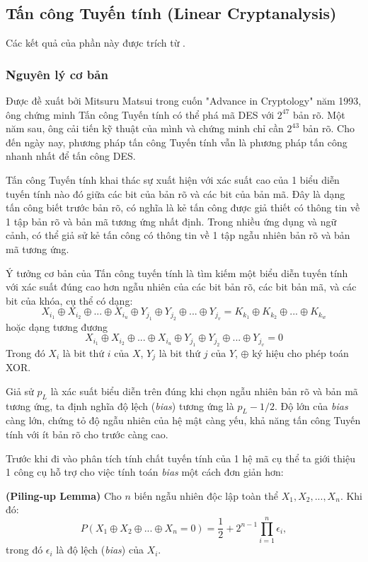\newpage
\subsection{Tấn công Tuyến tính (Linear Cryptanalysis) }
Các kết quả của phần này được trích từ \cite{hey2002}.
\subsubsection{Nguyên lý cơ bản}
Được đề xuất bởi Mitsuru Matsui trong cuốn "Advance in Cryptology" năm 1993, ông chứng minh Tấn công Tuyến tính có thể phá mã DES với $2^{47}$ bản rõ. Một năm sau, ông cải tiến kỹ thuật của mình và chứng minh chỉ cần $2^{43}$ bản rõ. Cho đến ngày nay, phương pháp tấn công Tuyến tính vẫn là phương pháp tấn công nhanh nhất để tấn công DES.

Tấn công Tuyến tính khai thác sự xuất hiện với xác suất cao của 1 biểu diễn tuyến tính nào đó giữa các bit của bản rõ và các bit của bản mã. Đây là dạng tấn công biết trước bản rõ, có nghĩa là kẻ tấn công được giả thiết có thông tin về 1 tập bản rõ và bản mã tương ứng nhất định. Trong nhiều ứng dụng và ngữ cảnh, có thể giả sử kẻ tấn công có thông tin về 1 tập ngẫu nhiên bản rõ và bản mã tương ứng.

Ý tưởng cơ bản của Tấn công tuyến tính là tìm kiếm một biểu diễn tuyến tính với xác suất đúng cao hơn ngẫu nhiên của các bit bản rõ, các bit bản mã, và các bit của khóa, cụ thể có dạng:
$$ X_{i_1} \oplus X_{i_2} \oplus ... \oplus X_{i_u} \oplus Y_{j_1} \oplus Y_{j_2} \oplus ... \oplus Y_{j_v} = K_{k_1} \oplus K_{k_2} \oplus ... \oplus K_{k_w} $$ 
hoặc dạng tương đương 
$$X_{i_1} \oplus X_{i_2} \oplus ... \oplus X_{i_u} \oplus Y_{j_1} \oplus Y_{j_2} \oplus ... \oplus Y_{j_v} = 0 $$
Trong đó $X_i$ là bit thứ $i$ của $X$, $Y_j$ là bit thứ $j$ của $Y$, $\oplus$ ký hiệu cho phép toán XOR.

Giả sử $p_L$ là xác suất biểu diễn trên đúng khi chọn ngẫu nhiên bản rõ và bản mã tương ứng, ta định nghĩa độ lệch (\emph{bias}) tương ứng là $p_L - 1/2.$ Độ lớn của \emph{bias} càng lớn, chứng tỏ độ ngẫu nhiên của hệ mật càng yếu, khả năng tấn công Tuyến tính với ít bản rõ cho trước càng cao.

Trước khi đi vào phân tích tính chất tuyến tính của 1 hệ mã cụ thể ta giới thiệu 1 công cụ hỗ trợ cho việc tính toán \emph{bias} một cách đơn giản hơn:

\textbf{(Piling-up Lemma)} Cho $n$ biến ngẫu nhiên độc lập toàn thể $X_1, X_2,..., X_n$. Khi đó:
    $$P(X_1 \oplus X_2 \oplus ... \oplus X_n = 0) = \frac{1}{2} + 2^{n-1} \prod_{i=1}^n \epsilon_i,  $$
    trong đó $\epsilon_i$ là độ lệch (\emph{bias}) của $X_i$.
